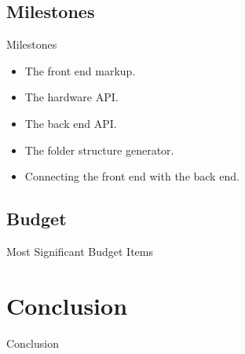 \documentclass[14pt, aspectratio=169]{beamer}
\begin{document}
\subsection{Milestones}
\begin{frame}{Milestones}
	\begin{itemize}
		\item The front end markup.
		\item The hardware API.
		\item The back end API.
		\item The folder structure generator.
		\item Connecting the front end with the back end.
	\end{itemize}
\end{frame}
\subsection{Budget}
\begin{frame}{Most Significant Budget Items}

\end{frame}
\section{Conclusion}
\begin{frame}{Conclusion}

\end{frame}
\end{document}
